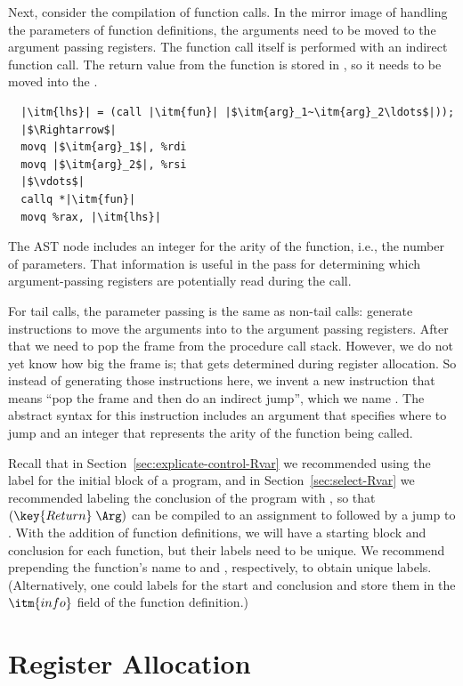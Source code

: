 \documentclass[11pt]{book}
\begin{document}
Next, consider the compilation of function calls. In the mirror image
of handling the parameters of function definitions, the arguments need
to be moved to the argument passing registers.  The function call
itself is performed with an indirect function call. The return value
from the function is stored in , so it needs to be moved
into the .
\begin{lstlisting}
  |\itm{lhs}| = (call |\itm{fun}| |$\itm{arg}_1~\itm{arg}_2\ldots$|));
  |$\Rightarrow$|
  movq |$\itm{arg}_1$|, %rdi
  movq |$\itm{arg}_2$|, %rsi
  |$\vdots$|
  callq *|\itm{fun}|
  movq %rax, |\itm{lhs}|
\end{lstlisting}
The  AST node includes an integer for the arity of
the function, i.e., the number of parameters. That information is
useful in the  pass for determining which
argument-passing registers are potentially read during the call.

For tail calls, the parameter passing is the same as non-tail calls:
generate instructions to move the arguments into to the argument
passing registers.  After that we need to pop the frame from the
procedure call stack.  However, we do not yet know how big the frame
is; that gets determined during register allocation. So instead of
generating those instructions here, we invent a new instruction that
means ``pop the frame and then do an indirect jump'', which we name
. The abstract syntax for this instruction includes an
argument that specifies where to jump and an integer that represents
the arity of the function being called.

Recall that in Section~\ref{sec:explicate-control-Rvar} we recommended
using the label  for the initial block of a program, and
in Section~\ref{sec:select-Rvar} we recommended labeling the conclusion
of the program with , so that $(\key{Return}\;\Arg)$
can be compiled to an assignment to  followed by a jump to
. With the addition of function definitions, we will
have a starting block and conclusion for each function, but their
labels need to be unique. We recommend prepending the function's name
to  and , respectively, to obtain unique
labels. (Alternatively, one could  labels for the start
and conclusion and store them in the $\itm{info}$ field of the
function definition.)


\section{Register Allocation}
\label{sec:register-allocation-r4}
\end{document}
